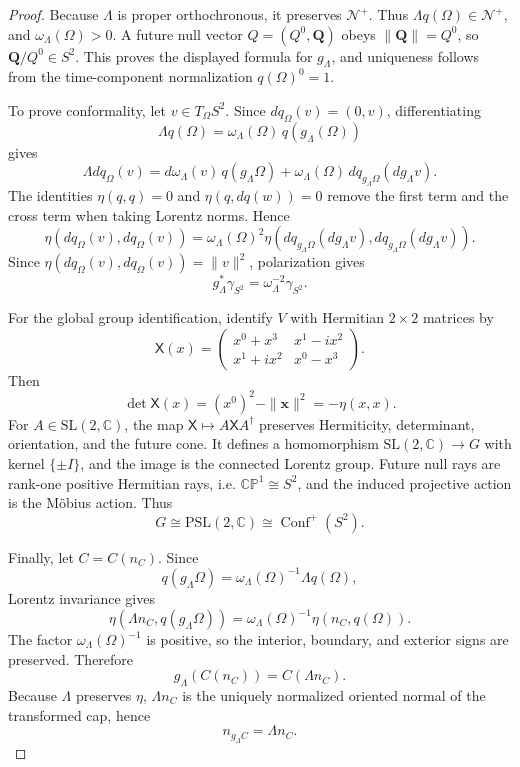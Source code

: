 \documentclass[11pt]{article}
\begin{document}
\begin{proof}
Because \(\Lambda\) is proper orthochronous, it preserves \(\mathcal N^+\).
Thus \(\Lambda q(\Omega)\in\mathcal N^+\), and
\(\omega_\Lambda(\Omega)>0\). A future null vector \(Q=(Q^0,\mathbf Q)\)
obeys \(\|\mathbf Q\|=Q^0\), so \(\mathbf Q/Q^0\in S^2\). This proves the
displayed formula for \(g_\Lambda\), and uniqueness follows from the
time-component normalization \(q(\Omega)^0=1\).

To prove conformality, let \(v\in T_\Omega S^2\). Since \(dq_\Omega(v)=(0,v)\),
differentiating
\[
\Lambda q(\Omega)=\omega_\Lambda(\Omega)\,q(g_\Lambda(\Omega))
\]
gives
\[
\Lambda dq_\Omega(v)
=d\omega_\Lambda(v)\,q(g_\Lambda\Omega)
+\omega_\Lambda(\Omega)\,dq_{g_\Lambda\Omega}(dg_\Lambda v).
\]
The identities \(\eta(q,q)=0\) and \(\eta(q,dq(w))=0\) remove the first term
and the cross term when taking Lorentz norms. Hence
\[
\eta(dq_\Omega(v),dq_\Omega(v))
=\omega_\Lambda(\Omega)^2
\eta\!\left(
dq_{g_\Lambda\Omega}(dg_\Lambda v),
dq_{g_\Lambda\Omega}(dg_\Lambda v)
\right).
\]
Since \(\eta(dq_\Omega(v),dq_\Omega(v))=\|v\|^2\), polarization gives
\[
g_\Lambda^*\gamma_{S^2}=\omega_\Lambda^{-2}\gamma_{S^2}.
\]

For the global group identification, identify \(V\) with Hermitian
\(2\times2\) matrices by
\[
\mathsf X(x)=
\begin{pmatrix}
x^0+x^3 & x^1-i x^2\\
x^1+i x^2 & x^0-x^3
\end{pmatrix}.
\]
Then
\[
\det\mathsf X(x)=(x^0)^2-\|\mathbf x\|^2=-\eta(x,x).
\]
For \(A\in\mathrm{SL}(2,\mathbb C)\), the map
\(\mathsf X\mapsto A\mathsf X A^\dagger\) preserves Hermiticity,
determinant, orientation, and the future cone. It defines a homomorphism
\(\mathrm{SL}(2,\mathbb C)\to G\) with kernel \(\{\pm I\}\), and the image is
the connected Lorentz group. Future null rays are rank-one positive
Hermitian rays, i.e. \(\mathbb{CP}^1\cong S^2\), and the induced projective
action is the M\"obius action. Thus
\[
G\cong\mathrm{PSL}(2,\mathbb C)\cong\operatorname{Conf}^{+}(S^2).
\]

Finally, let \(C=C(n_C)\). Since
\[
q(g_\Lambda\Omega)=\omega_\Lambda(\Omega)^{-1}\Lambda q(\Omega),
\]
Lorentz invariance gives
\[
\eta\!\left(\Lambda n_C,q(g_\Lambda\Omega)\right)
=\omega_\Lambda(\Omega)^{-1}\eta(n_C,q(\Omega)).
\]
The factor \(\omega_\Lambda(\Omega)^{-1}\) is positive, so the interior,
boundary, and exterior signs are preserved. Therefore
\[
g_\Lambda(C(n_C))=C(\Lambda n_C).
\]
Because \(\Lambda\) preserves \(\eta\), \(\Lambda n_C\) is the
uniquely normalized oriented normal of the transformed cap, hence
\[
n_{g_\Lambda C}=\Lambda n_C.
\]
\end{proof}
\end{document}
